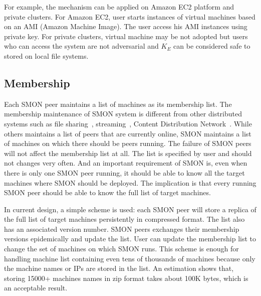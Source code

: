For example, the mechanism can be applied on Amazon EC2
platform and private clusters. For Amazon EC2, user starts
instances of virtual machines based on an AMI (Amazon
Machine Image). The user access his AMI instances using
private key. For private clusters, virtual machine may be not
adopted but users who can access the system are not
adversarial and $K_E$ can be considered safe to stored on
local file systems.

\subsection{Membership}

Each SMON peer maintains a list of machines as its
membership list.  The membership maintenance of SMON system
is different from other distributed systems such as file
sharing~\cite{bittorrent}, streaming~\cite{Kostic2003a},
Content Distribution Network~\cite{coral}. While others
maintains a list of peers that are currently online, SMON
maintains a list of machines on which there should be peers
running. The failure of SMON peers will not affect the
membership list at all.  The list is specified by user and
should not changes very often. And an important requirement
of SMON is, even when there is only one SMON peer running,
it should be able to know all the target machines where SMON
should be deployed.  The implication is that every running
SMON peer should be able to know the full list of target
machines.

In current design, a simple scheme is used: each SMON peer
will store a replica of the full list of target machines
persistently in compressed format. The list also has an
associated version number. SMON peers exchanges their
membership versions epidemically and update the list. User
can update the membership list to change the set of machines
on which SMON runs.
This scheme is enough for handling machine list containing
even tens of thousands of machines because only the machine
names or IPs are stored in the list.  An estimation shows
that, storing 15000+ machines names in zip format takes
about 100K bytes, which is an acceptable result.


